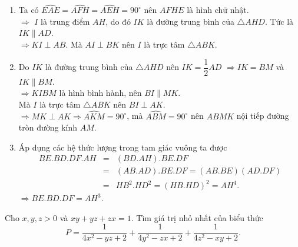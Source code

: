 \begin{ex}
{\begin{center}
\end{center}
\begin{enumerate}
\item Ta có $\widehat{EAE}=\widehat{AFH}=\widehat{AEH}=90^{\circ}$ nên $AFHE$ là hình chữ nhật.\\
$\Rightarrow$ $I$ là trung điểm $AH$, do đó $IK$ là đường trung bình của $\triangle AHD$. Tức là $IK\parallel AD$.\\
$\Rightarrow KI\perp AB$. Mà $AI\perp BK$ nên $I$ là trực tâm $\triangle ABK$.
\item Do $IK$ là đường trung bình của $\triangle AHD$ nên $IK=\dfrac{1}{2}AD$ $\Rightarrow IK=BM$ và $IK\parallel BM$.\\
$\Rightarrow KIBM$ là hình bình hành, nên $BI\parallel MK$.\\
Mà $I$ là trực tâm $\triangle ABK$ nên $BI\perp AK$.\\
$\Rightarrow MK\perp AK\Rightarrow \widehat{AKM}=90^{\circ}$, mà $\widehat{ABM}=90^{\circ}$ nên $ABMK$ nội tiếp đường tròn đường kính $AM$. 
\item Áp dụng các hệ thức lượng trong tam giác vuông ta được
\begin{eqnarray*}
BE.BD.DF.AH & = & (BD.AH).BE.DF\\
& = & (AB.AD).BE.DF = (AB.BE)(AD.DF)\\
& = & HB^2.HD^2=(HB.HD)^2=AH^4.
\end{eqnarray*}
$\Rightarrow BE.BD.DF=AH^3$.
\end{enumerate}
}
\end{ex}

\begin{ex}%
Cho $x,y,z>0$ và $xy+yz+zx=1$. Tìm giá trị nhỏ nhất của biểu thức
$$P=\dfrac{1}{4x^2-yz+2}+\dfrac{1}{4y^2-zx+2}+\dfrac{1}{4z^2-xy+2}.$$
\end{ex}

